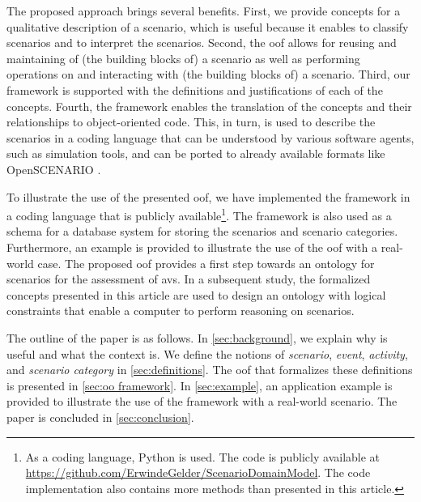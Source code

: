 The proposed approach brings several benefits.
First, we provide concepts for a qualitative description of a scenario, which is useful because it enables to classify scenarios and to interpret the scenarios. 
Second, the \ac{oof} allows for reusing and maintaining of (the building blocks of) a scenario as well as performing operations on and interacting with (the building blocks of) a scenario.
Third, our framework is supported with the definitions and justifications of each of the \cendc\cstartd concepts\cendd\cstartc.
Fourth, the framework enables the translation of the \cendc\cstartd concepts and their relationships \cendd\cstartc to object-oriented code.
This, in turn, is used to describe the scenarios in a coding language that can be understood by various software agents, such as simulation tools\cendc\cstartd, and can be ported to already available formats like OpenSCENARIO \cite{openscenario}. \cendd

\cstartc To illustrate the use of the presented \ac{oof}, we have implemented the framework in a coding language that is publicly available\footnote{As a coding language, Python is used. The code is publicly available at \url{https://github.com/ErwindeGelder/ScenarioDomainModel}. \cstarte The code implementation also contains more methods than presented in this article.\cende}.
The framework is also used as a schema for a database system for storing the scenarios and scenario categories.
Furthermore, an example is provided to illustrate the use of the \ac{oof} with a real-world case.
The proposed \ac{oof} provides a first step towards an ontology \autocite{siricharoen2009ontology} for scenarios for the assessment of \acp{av}. In a subsequent study, the formalized concepts presented in this article are used to design an ontology with logical constraints that enable a computer to perform reasoning on scenarios.
\cendc

The outline of the paper is as follows. In \cref{sec:background}, we explain why \cstartb {} \cendb is useful and what the context is. 
We define the notions of \emph{scenario}, \emph{event}, \emph{activity}, and \emph{scenario category}  in \cref{sec:definitions}. 
The \cstartb \ac{oof} \cendb that formalizes these definitions is presented in \cref{sec:oo framework}. 
In \cref{sec:example}, an application example is provided to illustrate the use of the \cstartb framework \cendb with a real-world scenario. 
The paper is concluded in \cref{sec:conclusion}.
